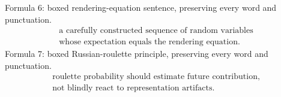\documentclass[11pt,twoside,openany]{book}
\begin{document}
\clearpage
\noindent Formula 6: boxed rendering-equation sentence, preserving every word and punctuation.
\[
\boxed{\begin{gathered}\text{a carefully constructed sequence of random variables}\\\text{whose expectation equals the rendering equation.}\end{gathered}}
\]
\clearpage
\noindent Formula 7: boxed Russian-roulette principle, preserving every word and punctuation.
\[
\boxed{\begin{gathered}\text{roulette probability should estimate future contribution,}\\\text{not blindly react to representation artifacts.}\end{gathered}}
\]
\end{document}
